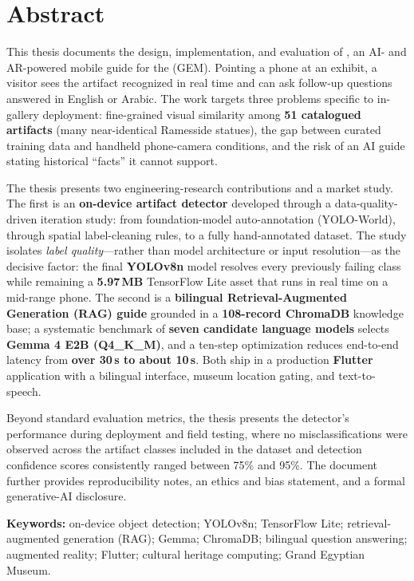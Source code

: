 \chapter*{Abstract}

This thesis documents the design, implementation, and evaluation of \TimeLens{},
an AI- and AR-powered mobile guide for the \GEM{} (GEM). Pointing a phone at an
exhibit, a visitor sees the artifact recognized in real time and can ask follow-up
questions answered in English or Arabic. The work targets three problems specific
to in-gallery deployment: fine-grained visual similarity among \textbf{51 catalogued
artifacts} (many near-identical Ramesside statues), the gap between curated training
data and handheld phone-camera conditions, and the risk of an AI guide stating
historical ``facts'' it cannot support.

The thesis presents two engineering-research contributions and a market study. The
first is an \textbf{on-device artifact detector} developed through a
data-quality-driven iteration study: from foundation-model auto-annotation
(YOLO-World), through spatial label-cleaning rules, to a fully hand-annotated
dataset. The study isolates \emph{label quality}---rather than model architecture or
input resolution---as the decisive factor: the final \textbf{YOLOv8n} model resolves
every previously failing class while remaining a \textbf{5.97\,MB} TensorFlow Lite
asset that runs in real time on a mid-range phone. The second is a \textbf{bilingual
Retrieval-Augmented Generation (RAG) guide} grounded in a \textbf{108-record ChromaDB}
knowledge base; a systematic benchmark of \textbf{seven candidate language models}
selects \textbf{Gemma 4 E2B (Q4\_K\_M)}, and a ten-step optimization reduces
end-to-end latency from \textbf{over 30\,s to about 10\,s}. Both ship in a production
\textbf{Flutter} application with a bilingual interface, museum location gating, and
text-to-speech.

Beyond standard evaluation metrics, the thesis presents the detector's performance during deployment and field testing,
where no misclassifications were observed across the artifact classes included in the dataset and detection confidence scores
consistently ranged between 75\% and 95\%. The document further provides reproducibility notes, an ethics and bias statement, and a formal generative-AI disclosure.

\vspace{1.2em}
\noindent\textbf{Keywords:} on-device object detection; YOLOv8n; TensorFlow Lite;
retrieval-augmented generation (RAG); Gemma; ChromaDB; bilingual question answering;
augmented reality; Flutter; cultural heritage computing; Grand Egyptian Museum.

